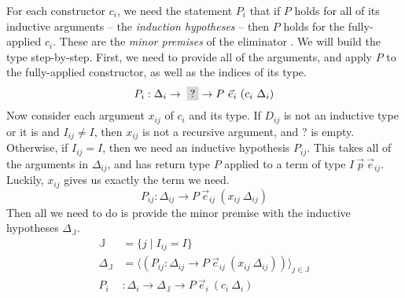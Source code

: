 \documentclass{report}
\newcommand{\hole}{\colorbox{gray!30}{?}}
\begin{document}
For each constructor $c_i$, we need the statement $P_i$ that if $P$ holds for all of its inductive arguments -- the \emph{induction hypotheses} -- then $P$ holds for the fully-applied $c_i$. These are the \emph{minor premises} of the eliminator \citep{inductive-families}. We will build the type step-by-step. First, we need to provide all of the arguments, and apply $P$ to the fully-applied constructor, as well as the indices of its type. $$P_i: \Delta_i \to \; \hole \to P ~ \Vec{e}_i ~ (c_i ~ \Delta_i)$$ Now consider each argument $x_{ij}$ of $c_i$ and its type. If $D_{ij}$ is not an inductive type or it is and $I_{ij} \neq I$, then $x_{ij}$ is not a recursive argument, and $?$ is empty. Otherwise, if $I_{ij} = I$, then we need an inductive hypothesis $P_{ij}$. This takes all of the arguments in $\Delta_{ij}$, and has return type $P$ applied to a term of type $I ~ \Vec{p} ~ \Vec{e}_{ij}$. Luckily, $x_{ij}$ gives us exactly the term we need. $$P_{ij}: \Delta_{ij} \to P ~ \Vec{e}_{ij} ~ (x_{ij} ~ \Delta_{ij})$$ Then all we need to do is provide the minor premise with the inductive hypotheses $\Delta_{\mathbb{J}}$.
%
\begin{align*}
    \mathbb{J} &= \{j \mid I_{ij} = I\} \\
    \Delta_{\mathbb{J}} &= \langle (P_{ij} : \Delta_{ij} \to P ~ \Vec{e}_{ij} ~ (x_{ij} ~ \Delta_{ij})) \rangle_{j \in \mathbb{J}} \\
    P_i &: \Delta_i \to \Delta_{\mathbb{J}} \to P ~ \Vec{e}_i ~ (c_i ~ \Delta_i)
\end{align*}
\end{document}
